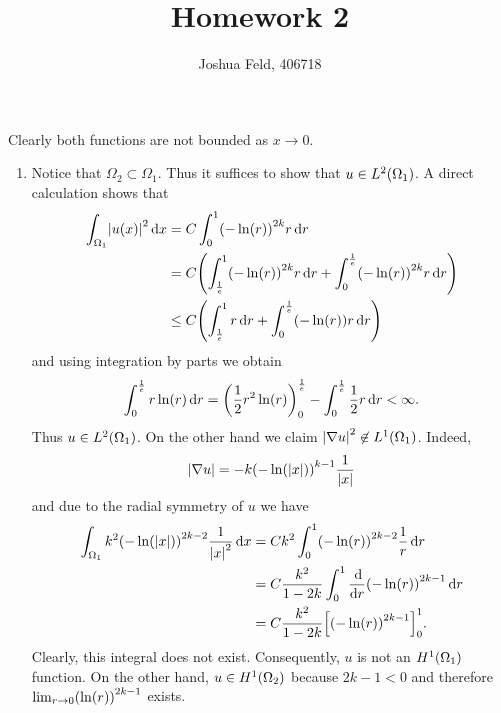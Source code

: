 \documentclass[english]{exercise}
\title{Homework 2}
\author{Joshua Feld, 406718}
\begin{document}
	\maketitle


	\section{}

	Clearly both functions are not bounded as \(x \to 0\).
	\begin{enumerate}
		\item Notice that \(\Omega_2 \subset \Omega_1\).
		Thus it suffices to show that \(u \in L^2\parentheses*{\Omega_1}\).
		A direct calculation shows that
		\begin{align*}
			\int_{\Omega_1}\absolute*{u\parentheses*{x}}^2 \d x &= C\int_0^1 \parentheses*{-\ln\parentheses*{r}}^{2k}r\d r\\
			&= C\parentheses*{\int_{\frac{1}{e}}^1 \parentheses*{-\ln\parentheses*{r}}^{2k}r\d r + \int_0^{\frac{1}{e}}\parentheses*{-\ln\parentheses*{r}}^{2k}r\d r}\\
			&\le C\parentheses*{\int_{\frac{1}{e}}^1 r\d r + \int_0^{\frac{1}{e}}\parentheses*{-\ln\parentheses*{r}}r\d r}
		\end{align*}
		and using integration by parts we obtain
		\[
			\int_0^{\frac{1}{e}}r\ln\parentheses*{r}\d r = \parentheses*{\frac{1}{2}r^2 \ln\parentheses*{r}}_0^{\frac{1}{e}} - \int_0^{\frac{1}{e}}\frac{1}{2}r\d r < \infty.
		\]
		Thus \(u \in L^2\parentheses*{\Omega_1}\).
		On the other hand we claim \(\absolute*{\nabla u}^2 \not\in L^1\parentheses*{\Omega_1}\).
		Indeed,
		\[
			\absolute*{\nabla u} = -k\parentheses*{-\ln\parentheses*{\absolute*{x}}}^{k - 1}\frac{1}{\absolute*{x}}
		\]
		and due to the radial symmetry of \(u\) we have
		\begin{align*}
			\int_{\Omega_1}k^2\parentheses*{-\ln\parentheses*{\absolute*{x}}}^{2k - 2}\frac{1}{\absolute*{x}^2}\d x &= Ck^2 \int_0^1 \parentheses*{-\ln\parentheses*{r}}^{2k - 2}\frac{1}{r}\d r\\
			&= C\frac{k^2}{1 - 2k}\int_0^1 \frac{\d}{\d r}\parentheses*{-\ln\parentheses*{r}}^{2k - 1}\d r\\
			&= C\frac{k^2}{1 - 2k}\brackets*{\parentheses*{-\ln\parentheses*{r}}^{2k - 1}}_0^1.
		\end{align*}
		Clearly, this integral does not exist.
		Consequently, \(u\) is not an \(H^1\parentheses*{\Omega_1}\) function.
		On the other hand, \(u \in H^1\parentheses*{\Omega_2}\) because \(2k - 1 < 0\) and therefore \(\lim_{r \to 0}\parentheses*{\ln\parentheses*{r}}^{2k - 1}\) exists.

\end{enumerate}
\end{document}
